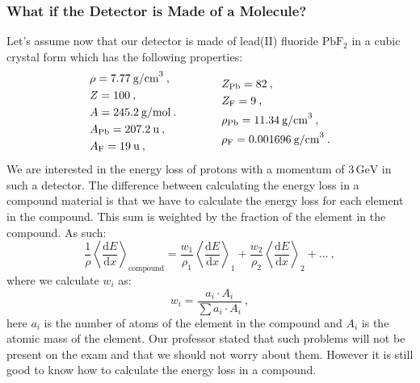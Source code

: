 \documentclass[10pt, titlepage, a4paper]{article}
\newcommand{\dd}{\mathrm{d}}
\numberwithin{equation}{section}
\begin{document}
\subsubsection{What if the Detector is Made of a Molecule?}
Let's assume now that our detector is made of lead(II) fluoride $\text{PbF}_2$ in a cubic crystal form which has the following properties:
%
\begin{equation*}
    \begin{aligned}
        & \rho = 7.77\>\text{g/cm}^3\>, \\
        & Z = 100\>, \\
        & A = 245.2\>\text{g/mol}\>. \\
        & A_{\rm{Pb}} = 207.2\>\text{u}\>, \\
        & A_{\rm{F} }= 19\>\text{u}\>, \\
    \end{aligned}
    \qquad\qquad
    \begin{aligned}
        & Z_{\rm{Pb}} = 82\>, \\
        & Z_{\rm{F} }= 9\>, \\
        & \rho_{\rm{Pb}} = 11.34\>\text{g/cm}^3\>, \\
        & \rho_{\rm{F}} = 0.001696\>\text{g/cm}^3\>.
    \end{aligned}
\end{equation*}
%
We are interested in the energy loss of protons with a momentum of $3\,\text{GeV}$ in such a detector. The difference between calculating the energy loss in a compound 
material is that we have to calculate the energy loss for each element in the compound. This sum is weighted by the fraction of the element in the compound. As such:
%
\begin{equation}
    \frac{1}{\rho} \left\langle \frac{\dd E}{\dd x} \right\rangle _{\text{compound}} = \frac{w_1}{\rho_1} \left\langle \frac{\dd E}{\dd x} \right\rangle _1 + \frac{w_2}{\rho_2} \left\langle \frac{\dd E}{\dd x} \right\rangle _2 + \ldots\>,
    \label{eq:bb-compound}
\end{equation}
%
where we calculate $w_i$ as:
%
\begin{equation}
    w_i = \frac{a_i\cdot A_i}{\sum a_i\cdot A_i}\>,
\end{equation}
%
here $a_i$ is the number of atoms of the element in the compound and $A_i$ is the atomic mass of the element. Our professor stated that such 
problems will not be present on the exam and that we should not worry about them. However it is still good to know how to calculate the energy loss in a compound.
\end{document}
